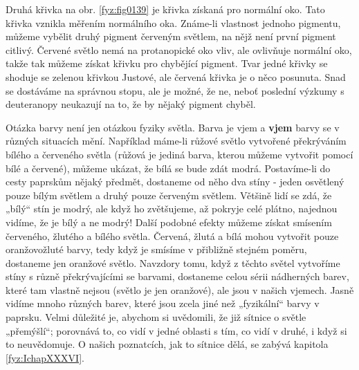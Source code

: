     Druhá křivka na obr. \ref{fyz:fig0139} je křivka získaná pro normální oko. Tato křivka vznikla
    měřením normálního oka. Známe-li vlastnost jednoho pigmentu, můžeme vybělit druhý pigment
    červeným světlem, na nějž není první pigment citlivý. Červené světlo nemá na protanopické oko
    vliv, ale ovlivňuje normální oko, takže tak můžeme získat křivku pro chybějící pigment. Tvar
    jedné křivky se shoduje se zelenou křivkou Justové, ale červená křivka je o něco posunuta. Snad
    se dostáváme na správnou stopu, ale je možné, že ne, neboť poslední výzkumy s deuteranopy
    neukazují na to, že by nějaký pigment chyběl.
    
    Otázka barvy není jen otázkou fyziky světla. Barva je vjem a \textbf{vjem} barvy se v různých 
    situacích mění. Například máme-li růžové světlo vytvořené překrýváním bílého a červeného světla 
    (růžová je jediná barva, kterou můžeme vytvořit pomocí bílé a červené), můžeme ukázat, že bílá 
    se bude zdát modrá. Postavíme-li do cesty paprskům nějaký předmět, dostaneme od něho dva stíny 
    - jeden osvětlený pouze bílým světlem a druhý pouze červeným světlem. Většině lidí se zdá, že 
    „bílý“ stín je modrý, ale když ho zvětšujeme, až pokryje celé plátno, najednou vidíme, že je 
    bílý a ne modrý! Další podobné efekty můžeme získat smísením červeného, žlutého a bílého 
    světla. Červená, žlutá a bílá mohou vytvořit pouze oranžovožluté barvy, tedy když je smísíme v 
    přibližně stejném poměru, dostaneme jen oranžové světlo. Navzdory tomu, když z těchto světel 
    vytvoříme stíny s různě překrývajícími se barvami, dostaneme celou sérii nádherných barev, 
    které tam vlastně nejsou (světlo je jen oranžové), ale jsou v našich vjemech. Jasně vidíme 
    mnoho různých barev, které jsou zcela jiné než „fyzikální“ barvy v paprsku. Velmi důležité je, 
    abychom si uvědomili, že již sítnice o světle „přemýšlí“; porovnává to, co vidí v jedné oblasti 
    s tím, co vidí v druhé, i když si to neuvědomuje. O našich poznatcích, jak to sítnice dělá, se 
    zabývá kapitola \ref{fyz:IchapXXXVI}. 
    

